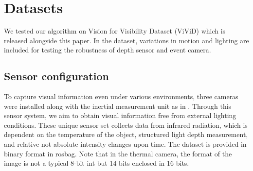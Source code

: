 \section{Datasets}

We tested our algorithm on Vision for Visibility Dataset (ViViD) which is released
alongside this paper. In the dataset, variations in motion and lighting are
included for testing the robustness of depth sensor and event camera.
\subsection{Sensor configuration}

To capture visual information even under various environments, three
cameras were installed along with the inertial measurement unit as in
. Through this sensor system, we aim to obtain visual
information free from external lighting conditions. These unique sensor set
collects data from infrared radiation, which is dependent on the temperature of
the object, structured light depth measurement, and relative not absolute
intensity changes upon time. The dataset is provided in binary format in rosbag.
Note that in the thermal camera, the format of the image is not a typical
8-bit int but 14 bits enclosed in 16 bits.


